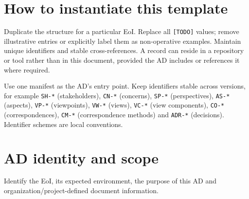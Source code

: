 \documentclass[11pt,letterpaper]{article}
\begin{document}
\InterpretationKey
\section{How to instantiate this template}
Duplicate the structure for a particular EoI. Replace all \texttt{[TODO]} values; remove illustrative entries or explicitly label them as non-operative examples. Maintain unique identifiers and stable cross-references. A record can reside in a repository or tool rather than in this document, provided the AD includes or references it where required.\par
\begin{Guidance}Use one manifest as the AD's entry point. Keep identifiers stable across versions, for example \texttt{SH-*} (stakeholders), \texttt{CN-*} (concerns), \texttt{SP-*} (perspectives), \texttt{AS-*} (aspects), \texttt{VP-*} (viewpoints), \texttt{VW-*} (views), \texttt{VC-*} (view components), \texttt{CO-*} (correspondences), \texttt{CM-*} (correspondence methods) and \texttt{ADR-*} (decisions). Identifier schemes are local conventions.\end{Guidance}
\section{AD identity and scope \texorpdfstring{}{(6.1)}}
\begin{Requirement}\FlagReq{} Identify the EoI, its expected environment, the purpose of this AD and organization/project-defined document information. \end{Requirement}
\end{document}
